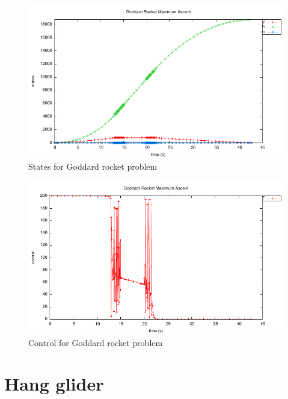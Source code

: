\documentclass[a4paper,11pt]{report}    %
\begin{document}
\begin{figure}
  \centering 
  \includegraphics{../examples/goddard/goddard_states}
  \caption{States for Goddard rocket problem}
 \label{fig:goddard_states}
\end{figure}


\begin{figure}
  \centering
  \includegraphics{../examples/goddard/goddard_control}
  \caption{Control for Goddard rocket problem}
 \label{fig:goddard_control}
\end{figure}



\section{Hang glider}
\end{document}

